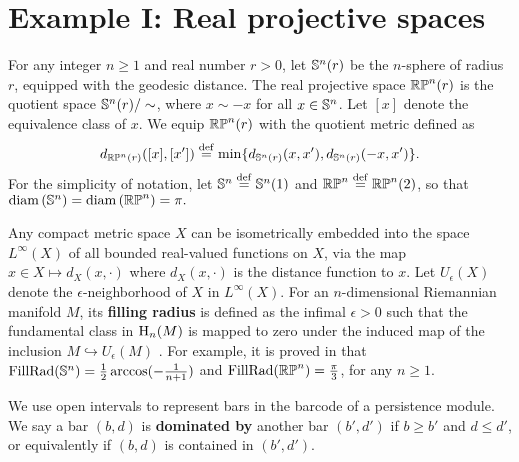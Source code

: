 
\section{Example I: Real projective spaces}\label{s:continuous}



For any integer $n\geq 1$ and real number $r>0$, let $\mathbb{S}^n(r)$ be the $n$-sphere of radius $r$, equipped with the geodesic distance. 
The real projective space $\mathbb{RP}^n(r)$ is the quotient space $\mathbb{S}^n(r)/\sim$, where $x\sim -x$ for all $x\in \mathbb{S}^n $. Let $[x]$ denote the equivalence class of $x$. We equip $\mathbb{RP}^n(r)$ with the quotient metric defined as
\[d_{\mathbb{RP}^n(r)}([x],[x'])\stackrel{\mathrm{def}}{=}\min \{d_{\mathbb{S}^n(r)}(x,x'),d_{\mathbb{S}^n(r)}(-x,x')\}.\]
For the simplicity of notation, let $\mathbb{S}^n\stackrel{\mathrm{def}}{=}\mathbb{S}^n(1)$ and $\mathbb{RP}^n\stackrel{\mathrm{def}}{=}\mathbb{RP}^n(2)$, so that $\operatorname{diam}\left(\mathbb{S}^n \right)=\operatorname{diam}\left(\mathbb{RP}^n \right)=\pi.$

Any compact metric space $X$ can be isometrically embedded into the space $L^\infty(X)$ of all bounded real-valued functions on $X$, via the map $x\in X\mapsto d_X(x,\cdot)$ where $d_X(x,\cdot)$ is the distance function to $x$. Let $U_\epsilon(X)$ denote the $\epsilon$-neighborhood of $X$ in $L^\infty(X)$.
For an $n$-dimensional Riemannian manifold $M$, its \textbf{filling radius} is defined as the infimal $\epsilon>0$ such that the fundamental class in $\operatorname{H}_n(M)$ is mapped to zero under the induced map of the inclusion $M\hookrightarrow U_\epsilon(M)$ \cite[page 108]{gromov2007metric}. 
For example, it is proved in \cite{katz1983filling} that $\operatorname{FillRad}(\mathbb{S}^n)=\frac{1}{2}\arccos(-\frac{1}{n+1})$ and $\operatorname{FillRad}(\mathbb{RP}^n)=\frac{\pi}{3}$, for any $n\geq 1$.

We use open intervals to represent bars in the barcode of a persistence module. We say a bar $(b,d)$ is \textbf{dominated by} another bar $(b',d')$ if $b\geq b'$ and $d\leq d'$, or equivalently if $(b,d)$ is contained in $(b',d')$.

